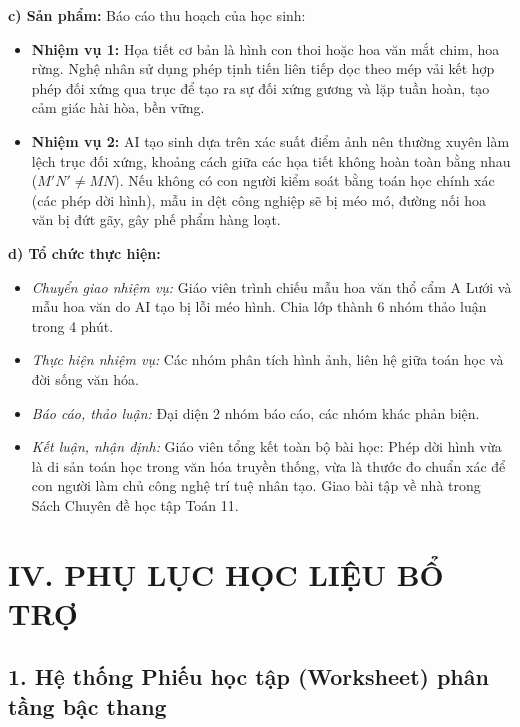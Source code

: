 \documentclass[12pt, a4paper]{article}
\begin{document}
\textbf{c) Sản phẩm:} Báo cáo thu hoạch của học sinh:
\begin{itemize}[leftmargin=0.6cm]
    \item \textbf{Nhiệm vụ 1:} Họa tiết cơ bản là hình con thoi hoặc hoa văn mắt chim, hoa rừng. Nghệ nhân sử dụng phép tịnh tiến liên tiếp dọc theo mép vải kết hợp phép đối xứng qua trục để tạo ra sự đối xứng gương và lặp tuần hoàn, tạo cảm giác hài hòa, bền vững.
    \item \textbf{Nhiệm vụ 2:} AI tạo sinh dựa trên xác suất điểm ảnh nên thường xuyên làm lệch trục đối xứng, khoảng cách giữa các họa tiết không hoàn toàn bằng nhau ($M'N' \neq MN$). Nếu không có con người kiểm soát bằng toán học chính xác (các phép dời hình), mẫu in dệt công nghiệp sẽ bị méo mó, đường nối hoa văn bị đứt gãy, gây phế phẩm hàng loạt.
\end{itemize}

\textbf{d) Tổ chức thực hiện:}
\begin{itemize}[leftmargin=0.6cm]
    \item \textit{Chuyển giao nhiệm vụ:} Giáo viên trình chiếu mẫu hoa văn thổ cẩm A Lưới và mẫu hoa văn do AI tạo bị lỗi méo hình. Chia lớp thành 6 nhóm thảo luận trong 4 phút.
    \item \textit{Thực hiện nhiệm vụ:} Các nhóm phân tích hình ảnh, liên hệ giữa toán học và đời sống văn hóa.
    \item \textit{Báo cáo, thảo luận:} Đại diện 2 nhóm báo cáo, các nhóm khác phản biện.
    \item \textit{Kết luận, nhận định:} Giáo viên tổng kết toàn bộ bài học: Phép dời hình vừa là di sản toán học trong văn hóa truyền thống, vừa là thước đo chuẩn xác để con người làm chủ công nghệ trí tuệ nhân tạo. Giao bài tập về nhà trong Sách Chuyên đề học tập Toán 11.
\end{itemize}

\newpage
\section*{IV. PHỤ LỤC HỌC LIỆU BỔ TRỢ}

\subsection*{1. Hệ thống Phiếu học tập (Worksheet) phân tầng bậc thang}
\end{document}
